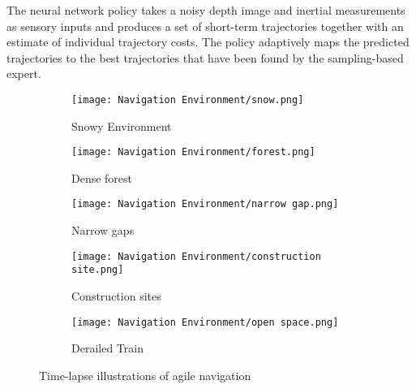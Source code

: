 The neural network policy takes a
noisy depth image and inertial measurements as sensory inputs and
produces a set of short-term trajectories together with an estimate of
individual trajectory costs. The policy
adaptively maps the
predicted trajectories to the best trajectories that have been found by the sampling-based expert. 

\begin{figure}
	\centering
	\begin{subfigure}[b]{\textwidth}
		\centering
		\texttt{[image: Navigation Environment/snow.png]}
		\caption{Snowy Environment}
	\end{subfigure}
	\hfill
	\begin{subfigure}[b]{0.48\textwidth}
		\centering
		\texttt{[image: Navigation Environment/forest.png]}
		\caption{Dense forest}
	\end{subfigure}
	\hfill	
	\begin{subfigure}[b]{0.48\textwidth}
		\centering
		\texttt{[image: Navigation Environment/narrow gap.png]}
		\caption{Narrow gaps}
	\end{subfigure}
	\hfill
	\begin{subfigure}[b]{0.48\textwidth}
		\centering
		\texttt{[image: Navigation Environment/construction site.png]}
		\caption{Construction sites}
	\end{subfigure}
	\hfill
	\begin{subfigure}[b]{0.48\textwidth}
		\centering
		\texttt{[image: Navigation Environment/open space.png]}
		\caption{Derailed Train}
	\end{subfigure}
	
	\caption{Time-lapse illustrations of agile navigation}
	\label{fig:navigation real envt}
\end{figure}